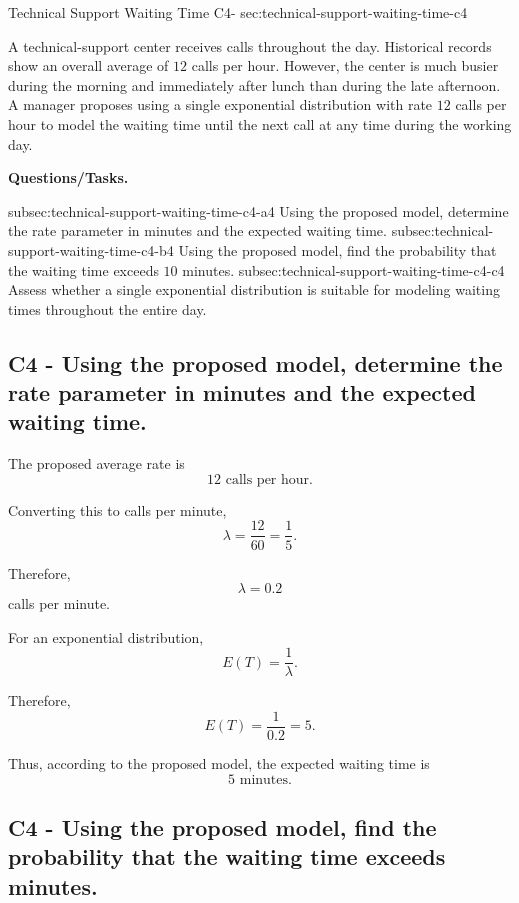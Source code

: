 	\sectionScored
	{Technical Support Waiting Time}
	{C4-}
	{sec:technical-support-waiting-time-c4}
	{
	A technical-support center receives calls throughout the day. Historical records show an overall average of $12$ calls per hour. However, the center is much busier during the morning and immediately after lunch than during the late afternoon. A manager proposes using a single exponential distribution with rate $12$ calls per hour to model the waiting time until the next call at any time during the working day.
	
	\textbf{Questions/Tasks.}
	\begin{enumerate}
		\CriterionTask
		{subsec:technical-support-waiting-time-c4-a}{4}
		{Using the proposed model, determine the rate parameter in minutes and the expected waiting time. }
		\CriterionTask
		{subsec:technical-support-waiting-time-c4-b}{4}
		{Using the proposed model, find the probability that the waiting time exceeds $10$ minutes. }
		\CriterionTask
		{subsec:technical-support-waiting-time-c4-c}{4}
		{Assess whether a single exponential distribution is suitable for modeling waiting times throughout the entire day. }
	\end{enumerate}
	
	\label{subsec:technical-support-waiting-time-c4-a}
	\subsection*{C4 - Using the proposed model, determine the rate parameter in minutes and the expected waiting time. }
	
	The proposed average rate is
	\[
	12\text{ calls per hour}.
	\]
	
	Converting this to calls per minute,
	\[
	\lambda=\frac{12}{60}
	=\frac{1}{5}.
	\]
	
	Therefore,
	\[
	\lambda=0.2
	\]
	calls per minute.
	
	For an exponential distribution,
	\[
	E(T)=\frac{1}{\lambda}.
	\]
	
	Therefore,
	\[
	E(T)=\frac{1}{0.2}=5.
	\]
	
	Thus, according to the proposed model, the expected waiting time is
	\[
	\boxed{5\text{ minutes}.}
	\]
	

	\label{subsec:technical-support-waiting-time-c4-b}
	\subsection*{C4 - Using the proposed model, find the probability that the waiting time exceeds  minutes. }
	
}
